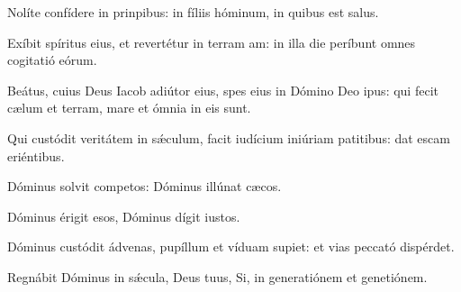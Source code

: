 \item {}

\item Nolíte confídere in prinpibus:\psstar{} in fíliis hóminum, in quibus  est salus.

\item Exíbit spíritus eius, et revertétur in terram am:\psstar{} in illa die períbunt omnes cogitatió eórum.

\item Beátus, cuius Deus Iacob adiútor eius,\pscross{} spes eius in Dómino Deo ipus:\psstar{} qui fecit cælum et terram, mare et ómnia  in eis sunt.

\item Qui custódit veritátem in sǽculum,\pscross{} facit iudícium iniúriam patitibus:\psstar{} dat escam eriéntibus.

\item Dóminus solvit competos:\psstar{} Dóminus illúnat cæcos.

\item Dóminus érigit esos,\psstar{} Dóminus dígit iustos.

\item Dóminus custódit ádvenas,\pscross{} pupíllum et víduam supiet:\psstar{} et vias peccató dispérdet.

\item Regnábit Dóminus in sǽcula,\pscross{} Deus tuus, Si,\psstar{} in generatiónem et genetiónem.

